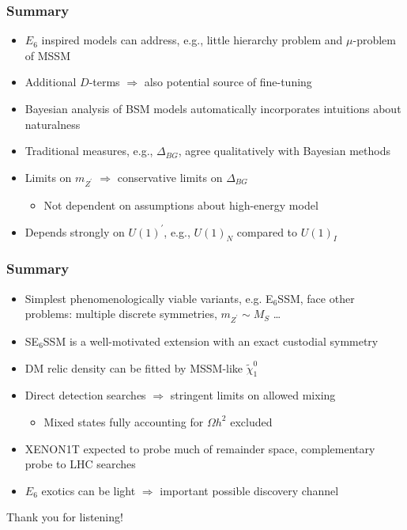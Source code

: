 \documentclass[10pt,aspectratio=169]{beamer}
\begin{document}
\begin{frame}
  \frametitle{Summary}
  \begin{itemize} \itemsep1em
    \item $E_6$ inspired models can address, e.g., little hierarchy problem
    and $\mu$-problem of MSSM
  \item Additional $D$-terms $\Rightarrow$ also potential source of
    fine-tuning
  \item Bayesian analysis of BSM models automatically incorporates
    intuitions about naturalness
  \item Traditional measures, e.g., $\Delta_{BG}$, agree qualitatively
    with Bayesian methods
  \item Limits on $m_{Z^\prime}$ $\Rightarrow$ conservative limits on
    $\Delta_{BG}$
    \begin{itemize}
      \item Not dependent on assumptions about high-energy model
    \end{itemize}
  \item Depends strongly on $U(1)^\prime$, e.g., $U(1)_N$ compared to $U(1)_I$
  \end{itemize}
\end{frame}

\begin{frame}
  \frametitle{Summary}

  \begin{itemize} \itemsep1em
  \item Simplest phenomenologically viable variants, e.g. E$_6$SSM,
    face other problems: multiple discrete symmetries, $m_{Z^\prime} \sim M_S$
    \ldots
  \item SE$_6$SSM is a well-motivated extension with an exact custodial
    symmetry
  \item DM relic density can be fitted by MSSM-like $\tilde{\chi}_1^0$
  \item Direct detection searches $\Rightarrow$ stringent limits on
    allowed mixing
    \begin{itemize}
      \item Mixed states fully accounting for $\Omega h^2$ excluded
    \end{itemize}
  \item XENON1T expected to probe much of remainder space, complementary
    probe to LHC searches
  \item $E_6$ exotics can be light $\Rightarrow$ important possible
    discovery channel
  \end{itemize}

  \begin{center}
    \large Thank you for listening!
  \end{center}

\end{frame}
\end{document}
